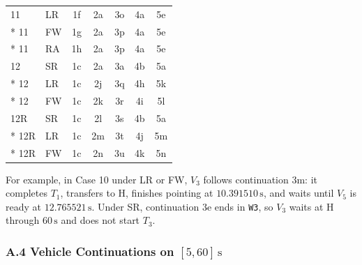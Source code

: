 \documentclass{swmcmthesis}
\begin{document}
\begin{longtable}{@{}llccccc@{}}
    11 & LR & 1f & 2a & 3o & 4a & 5e \\*
    11 & FW & 1g & 2a & 3p & 4a & 5e \\*
    11 & RA & 1h & 2a & 3p & 4a & 5e \\
    12 & SR & 1c & 2a & 3a & 4b & 5a \\*
    12 & LR & 1c & 2j & 3q & 4h & 5k \\*
    12 & FW & 1c & 2k & 3r & 4i & 5l \\
    12R & SR & 1c & 2l & 3s & 4b & 5a \\*
    12R & LR & 1c & 2m & 3t & 4j & 5m \\*
    12R & FW & 1c & 2n & 3u & 4k & 5n \\
\end{longtable}

For example, in Case 10 under LR or FW, $V_3$ follows continuation 3m: it completes $T_1$, transfers to H, finishes pointing at $10.391510\,\mathrm{s}$, and waits until $V_5$ is ready at $12.765521\,\mathrm{s}$. Under SR, continuation 3e ends in \texttt{W3}, so $V_3$ waits at H through $60\,\mathrm{s}$ and does not start $T_3$.

\subsubsection*{A.4 Vehicle Continuations on $[5,60]\,\mathrm{s}$}
\end{document}
